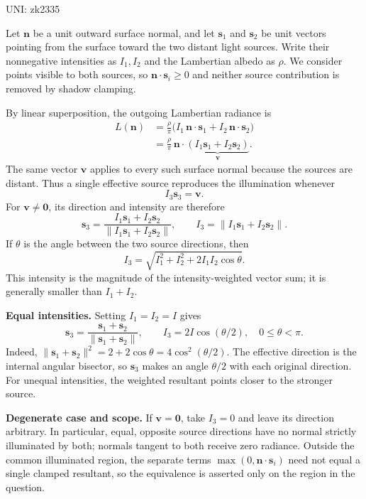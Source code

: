 \documentclass[11pt]{article}
\begin{document}
UNI: zk2335

Let $\mathbf n$ be a unit outward surface normal, and let $\mathbf s_1$ and $\mathbf s_2$ be unit vectors pointing from the surface toward the two distant light sources. Write their nonnegative intensities as $I_1,I_2$ and the Lambertian albedo as $\rho$. We consider points visible to both sources, so $\mathbf n\cdot\mathbf s_i\geq0$ and neither source contribution is removed by shadow clamping.

By linear superposition, the outgoing Lambertian radiance is
\begin{align*}
L(\mathbf n)
&=\frac{\rho}{\pi}\bigl(I_1\,\mathbf n\cdot\mathbf s_1+I_2\,\mathbf n\cdot\mathbf s_2\bigr)\\
&=\frac{\rho}{\pi}\,\mathbf n\cdot\underbrace{(I_1\mathbf s_1+I_2\mathbf s_2)}_{\mathbf v}.
\end{align*}
The same vector $\mathbf v$ applies to every such surface normal because the sources are distant. Thus a single effective source reproduces the illumination whenever
\[
I_3\mathbf s_3=\mathbf v.
\]
For $\mathbf v\neq\mathbf0$, its direction and intensity are therefore
\[
\boxed{\displaystyle \mathbf s_3=\frac{I_1\mathbf s_1+I_2\mathbf s_2}{\|I_1\mathbf s_1+I_2\mathbf s_2\|}},
\qquad
\boxed{\displaystyle I_3=\|I_1\mathbf s_1+I_2\mathbf s_2\|}.
\]
If $\theta$ is the angle between the two source directions, then
\[
I_3=\sqrt{I_1^2+I_2^2+2I_1I_2\cos\theta}.
\]
This intensity is the magnitude of the intensity-weighted vector sum; it is generally smaller than $I_1+I_2$.

\textbf{Equal intensities.} Setting $I_1=I_2=I$ gives
\[
\boxed{\displaystyle \mathbf s_3=\frac{\mathbf s_1+\mathbf s_2}{\|\mathbf s_1+\mathbf s_2\|}},
\qquad
\boxed{\displaystyle I_3=2I\cos(\theta/2)},\quad 0\leq\theta<\pi.
\]
Indeed, $\|\mathbf s_1+\mathbf s_2\|^2=2+2\cos\theta=4\cos^2(\theta/2)$. The effective direction is the internal angular bisector, so $\mathbf s_3$ makes an angle $\theta/2$ with each original direction. For unequal intensities, the weighted resultant points closer to the stronger source.

\textbf{Degenerate case and scope.} If $\mathbf v=\mathbf0$, take $I_3=0$ and leave its direction arbitrary. In particular, equal, opposite source directions have no normal strictly illuminated by both; normals tangent to both receive zero radiance. Outside the common illuminated region, the separate terms $\max(0,\mathbf n\cdot\mathbf s_i)$ need not equal a single clamped resultant, so the equivalence is asserted only on the region in the question.
\end{document}
